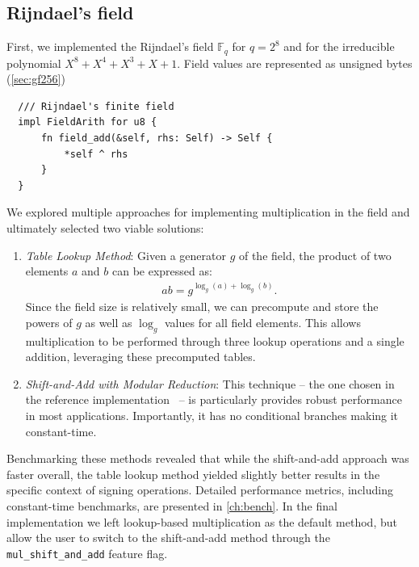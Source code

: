 \documentclass[11pt]{report}
\theoremstyle{definition}
\theoremstyle{plain}
\begin{document}
\subsection{Rijndael's field}\label{sub:rijndael_field}

First, we implemented the Rijndael's field $\mathbb{F}_{q}$ for $q=2^8$ and for the irreducible polynomial $X^8 + X^4 + X^3 + X + 1$. Field values are represented as unsigned bytes  (\autoref{sec:gf256})
\begin{verbatim}
  /// Rijndael's finite field 
  impl FieldArith for u8 {
      fn field_add(&self, rhs: Self) -> Self {
          *self ^ rhs
      }
  }
\end{verbatim}

We explored multiple approaches for implementing multiplication in the field and ultimately selected two viable solutions:

\begin{enumerate}
  \item \textit{Table Lookup Method}: Given a generator $g$ of the field, the product of two elements $a$ and $b$ can be expressed as:
        \begin{align*}
          ab = g^{\log_g(a) + \log_g(b)}.
        \end{align*}
        Since the field size is relatively small, we can precompute and store the powers of $g$ as well as $\log_g$ values for all field elements. This allows multiplication to be performed through three lookup operations and a single addition, leveraging these precomputed tables.

  \item \textit{Shift-and-Add with Modular Reduction}: This technique -- the one chosen in the reference implementation~\cite{aguilarsyndrome11} -- is particularly provides robust performance in most applications. Importantly, it has no conditional branches making it constant-time.
\end{enumerate}

Benchmarking these methods revealed that while the shift-and-add approach was faster overall, the table lookup method yielded slightly better results in the specific context of signing operations. Detailed performance metrics, including constant-time benchmarks, are presented in \autoref{ch:bench}. In the final implementation we left lookup-based multiplication as the default method, but allow the user to switch to the shift-and-add method through the \texttt{mul\_shift\_and\_add} feature flag.
\end{document}
